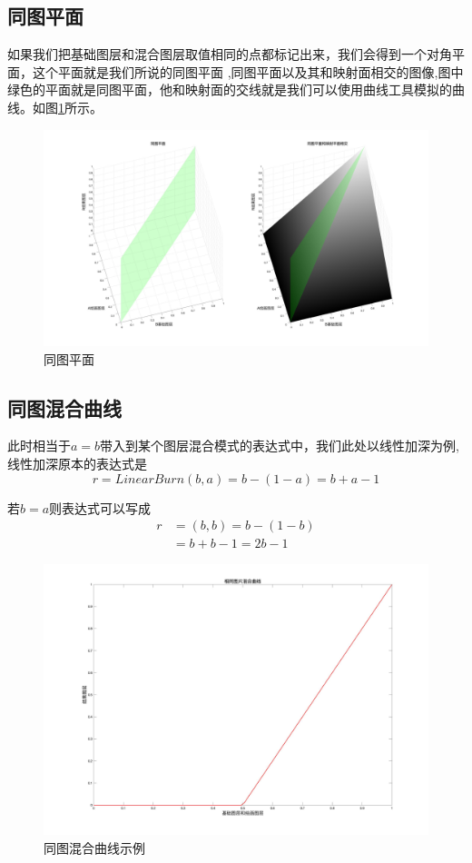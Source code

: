 \subsection{ 同图平面}
如果我们把基础图层和混合图层取值相同的点都标记出来，我们会得到一个对角平面，这个平面就是我们所说的同图平面 ,同图平面以及其和映射面相交的图像,图中绿色的平面就是同图平面，他和映射面的交线就是我们可以使用曲线工具模拟的曲线。如图\ref{fig:samepicsuf}所示。
\begin{figure}[!htb]
	\centering
	\includegraphics[width=\linewidth]{figure/同图平面}
	\caption{同图平面}
	\label{fig:samepicsuf}
\end{figure}

\subsection{ 同图混合曲线}
此时相当于$a=b$带入到某个图层混合模式的表达式中，我们此处以线性加深为例,线性加深原本的表达式是
\begin{equation}
	r=LinearBurn(b,a)=b-(1-a)=b+a-1
\end{equation}

若$b=a$则表达式可以写成
\begin{equation}
	\begin{aligned} r&=(b,b)=b-(1-b)\\&=b+b-1=2b-1\end{aligned}
\end{equation} 
\begin{figure}[!htb]
	\centering
	\includegraphics[width=0.7\linewidth]{figure/同图混合曲线示例}
	\caption{同图混合曲线示例}
	\label{fig:samepic}
\end{figure}

